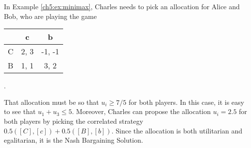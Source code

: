 \begin{example}
\label{example:AliceBobCinemaBargain}
In Example  \ref{ch5:ex:minimax}, Charles needs to pick an allocation for Alice and Bob, who are playing the game
\begin{center}
\begin{tabular}{c | c  c}
& c & b\\
\hline
C & 2, 3 & -1, -1  \\
B & 1, 1 & 3, 2
\end{tabular}
.
\end{center}
That allocation must be so that $u_i \geq 7/5$ for both players.
In this case, it is easy to see that $u_1 + u_3 \leq 5$. Moreover, Charles can propose the allocation $u_i = 2.5$ for both players by picking the correlated strategy $0.5([C],[c]) + 0.5([B],[b])$.
Since the allocation is both utilitarian and egalitarian, it is the Nash Bargaining Solution.
\end{example}
